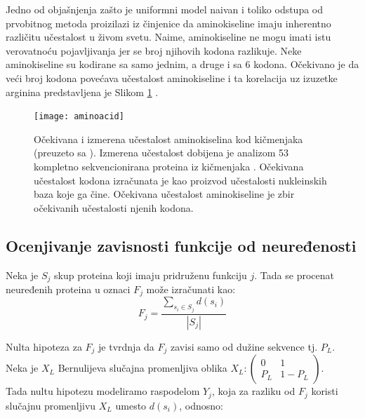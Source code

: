 Jedno od objašnjenja zašto je uniformni model naivan i toliko odstupa od
prvobitnog metoda proizilazi iz činjenice da aminokiseline imaju inherentno
različitu učestalost u živom svetu. Naime, aminokiseline ne mogu  imati istu
verovatnoću pojavljivanja jer se  broj njihovih kodona razlikuje. Neke
aminokiseline su kodirane sa samo jednim, a druge i sa 6 kodona. Očekivano je
da veći broj kodona povećava učestalost aminokiseline i ta korelacija uz
izuzetke arginina predstavljena je Slikom \ref{fig:aminoacid}
\parencite{AKfrekvencija}.

\begin{figure}[th]
\centering
\texttt{[image: aminoacid]}
\caption{Očekivana i izmerena učestalost aminokiselina kod kičmenjaka (preuzeto sa \cite{AA_freq_link}).  \footnotesize
  Izmerena učestalost dobijena je analizom 53 kompletno sekvencionirana proteina iz kičmenjaka \cite{King1969}.
  Očekivana učestalost kodona izračunata je kao proizvod učestalosti nukleinskih baza koje ga čine.
  Očekivana učestalost aminokiseline je zbir očekivanih učestalosti njenih kodona.
}
\label{fig:aminoacid}
\end{figure}




\clearpage
\label{ocenjivanje}
\subsection{Ocenjivanje zavisnosti funkcije od neuređenosti}

Neka je $S_j$ skup proteina koji imaju pridruženu funkciju $j$. Tada se procenat
neuređenih proteina u oznaci $F_j$ može izračunati kao:
$$F_j = \dfrac{\sum_{s_i \in S_j} d(s_i)} {|S_j|} $$



Nulta hipoteza za $F_j$ je tvrdnja da $F_j$ zavisi samo od dužine sekvence tj. $P_L$. \\
Neka je $X_L$ Bernulijeva slučajna promenljiva oblika $X_L : \begin{pmatrix} 0 & 1\\ P_L & 1-P_L \end{pmatrix}$. \\
Tada nultu hipotezu modeliramo raspodelom $Y_j$, koja za razliku od $F_j$ koristi
slučajnu promenljivu $X_L$ umesto  $d(s_i)$, odnosno:



